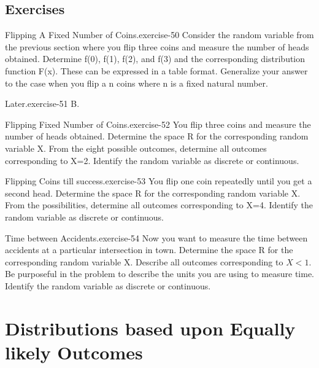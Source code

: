 \documentclass[10pt,]{book}
\numberwithin{equation}{section}
\newcommand{\lt}{<}
\begin{document}
\section[{Exercises}]{Exercises}\label{section-38}
\begin{inlineexercise}{Flipping A Fixed Number of Coins.}{exercise-50}%
\hypertarget{p-781}{}%
Consider the random variable from the previous section where you flip three coins and measure the number of heads obtained. Determine f(0), f(1), f(2), and f(3) and the corresponding distribution function F(x). These can be expressed in a table format. Generalize your answer to the case when you flip a n coins where n is a fixed natural number.%
\end{inlineexercise}
\begin{inlineexercise}{Later.}{exercise-51}%
\hypertarget{p-782}{}%
B.%
\end{inlineexercise}
\begin{inlineexercise}{Flipping Fixed Number of Coins.}{exercise-52}%
\hypertarget{p-783}{}%
You flip three coins and measure the number of heads obtained. Determine the space R for the corresponding random variable X. From the eight possible outcomes, determine all outcomes corresponding to X=2. Identify the random variable as discrete or continuous.%
\end{inlineexercise}
\begin{inlineexercise}{Flipping Coins till success.}{exercise-53}%
\hypertarget{p-784}{}%
You flip one coin repeatedly until you get a second head. Determine the space R for the corresponding random variable X. From the possibilities, determine all outcomes corresponding to X=4. Identify the random variable as discrete or continuous.%
\end{inlineexercise}
\begin{inlineexercise}{Time between Accidents.}{exercise-54}%
\hypertarget{p-785}{}%
Now you want to measure the time between accidents at a particular intersection in town. Determine the space R for the corresponding random variable X. Describe all outcomes corresponding to \(X \lt 1\). Be purposeful in the problem to describe the units you are using to measure time. Identify the random variable as discrete or continuous.%
\end{inlineexercise}
%
%
\typeout{************************************************}
\typeout{************************************************}
%
\chapter[{Distributions based upon Equally likely Outcomes}]{Distributions based upon Equally likely Outcomes}\label{UniformHypergeometric}
%
%
\typeout{************************************************}
\typeout{************************************************}
%
\end{document}
